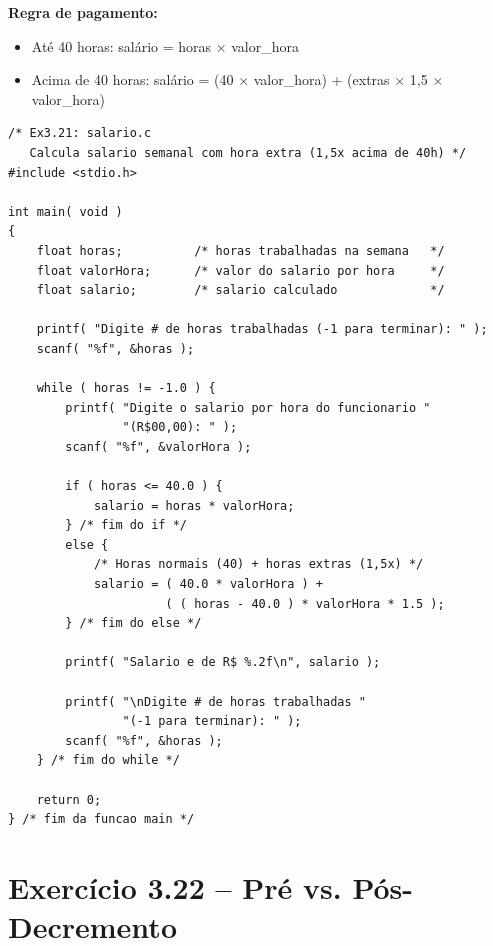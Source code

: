 \documentclass[12pt,a4paper]{article}
\begin{document}
\begin{respostabox}
\textbf{Regra de pagamento:}
\begin{itemize}[noitemsep]
  \item Até 40 horas: salário = horas $\times$ valor\_hora
  \item Acima de 40 horas: salário = (40 $\times$ valor\_hora) + (extras $\times$ 1{,}5 $\times$ valor\_hora)
\end{itemize}

\begin{lstlisting}
/* Ex3.21: salario.c
   Calcula salario semanal com hora extra (1,5x acima de 40h) */
#include <stdio.h>

int main( void )
{
    float horas;          /* horas trabalhadas na semana   */
    float valorHora;      /* valor do salario por hora     */
    float salario;        /* salario calculado             */

    printf( "Digite # de horas trabalhadas (-1 para terminar): " );
    scanf( "%f", &horas );

    while ( horas != -1.0 ) {
        printf( "Digite o salario por hora do funcionario "
                "(R$00,00): " );
        scanf( "%f", &valorHora );

        if ( horas <= 40.0 ) {
            salario = horas * valorHora;
        } /* fim do if */
        else {
            /* Horas normais (40) + horas extras (1,5x) */
            salario = ( 40.0 * valorHora ) +
                      ( ( horas - 40.0 ) * valorHora * 1.5 );
        } /* fim do else */

        printf( "Salario e de R$ %.2f\n", salario );

        printf( "\nDigite # de horas trabalhadas "
                "(-1 para terminar): " );
        scanf( "%f", &horas );
    } /* fim do while */

    return 0;
} /* fim da funcao main */
\end{lstlisting}
\end{respostabox}

\section{Exercício 3.22 -- Pré vs. Pós-Decremento}
\end{document}
